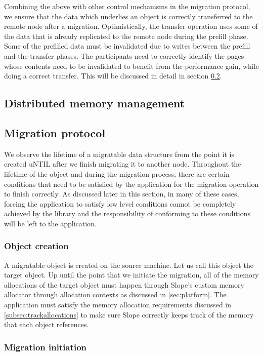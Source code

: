 Combining the above with other control mechanisms in the migration protocol, we
ensure that the data which underlies an object is correctly transferred to the
remote node after a migration. Optimistically, the transfer operation uses some
of the data that is already replicated to the remote node during the prefill
phase. Some of the prefilled data must be invalidated due to writes between the
prefill and the transfer phases. The participants need to correctly identify
the pages whose contents need to be invalidated to benefit from the performance
gain, while doing a correct transfer. This will be discussed in detail in section
\ref{sec:migrationprotocol}.

\subsection{Distributed memory management}

\subsection{Migration protocol}
\label{sec:migrationprotocol}
We observe the lifetime of a migratable data structure from the point it is
created uNTIL after we finish migrating it to another node. Throughout the
lifetime of the object and during the migration process, there are certain
conditions that need to be satisfied by the application for the migration
operation to finish correctly. As discussed later in this section,
in many of these cases, forcing the application to satisfy low level conditions
cannot be completely achieved by the library and the responsibility of
conforming to these conditions will be left to the application.

\subsubsection{Object creation}
A migratable object is created on the source machine. Let us call this object
the target object. Up until the point that
we initiate the migration, all of the memory allocations of the target object
must happen through
Slope's custom memory allocator through allocation contexts as discussed in
\ref{sec:platform}.
The application must satisfy the memory allocation requirements discussed in
\ref{subsec:trackallocations} to make sure Slope correctly keeps track of the
memory that each object references.

\subsubsection{Migration initiation}

